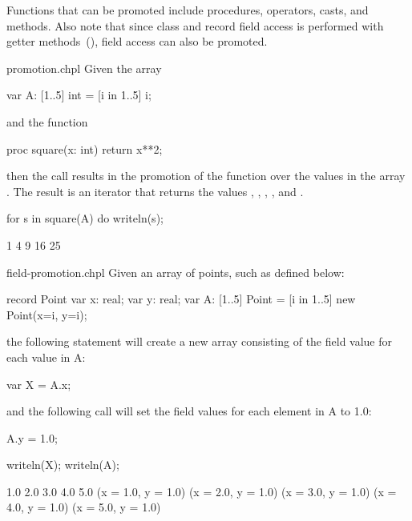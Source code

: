 Functions that can be promoted include procedures, operators, casts,
and methods. Also note that since class and record field access
is performed with getter methods~(), field
access can also be promoted.

\begin{chapelexample}{promotion.chpl}
Given the array
\begin{chapel}
var A: [1..5] int = [i in 1..5] i;
\end{chapel}
and the function
\begin{chapel}
proc square(x: int) return x**2;
\end{chapel}
then the call  results in the promotion of
the  function over the values in the array .  The
result is an iterator that returns the
values , , , , and .
\begin{chapelnoprint}
for s in square(A) do writeln(s);
\end{chapelnoprint}
\begin{chapeloutput}
1
4
9
16
25
\end{chapeloutput}
\end{chapelexample}

\begin{chapelexample}{field-promotion.chpl}
Given an array of points, such as  defined below:
\begin{chapel}
record Point {
  var x: real;
  var y: real;
}
var A: [1..5] Point = [i in 1..5] new Point(x=i, y=i);
\end{chapel}
the following statement will create a new array consisting of
the  field value for each value in A:
\begin{chapel}
var X = A.x;
\end{chapel}
and the following call will set the  field values for each
element in A to 1.0:
\begin{chapel}
A.y = 1.0;
\end{chapel}

\begin{chapelnoprint}
writeln(X);
writeln(A);
\end{chapelnoprint}
\begin{chapeloutput}
1.0 2.0 3.0 4.0 5.0
(x = 1.0, y = 1.0) (x = 2.0, y = 1.0) (x = 3.0, y = 1.0) (x = 4.0, y = 1.0) (x = 5.0, y = 1.0)
\end{chapeloutput}
\end{chapelexample}



